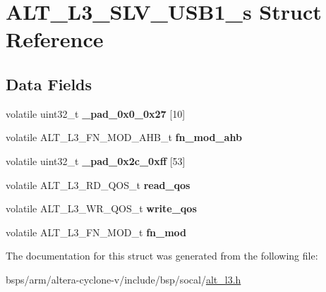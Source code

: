 \hypertarget{structALT__L3__SLV__USB1__s}{}\section{A\+L\+T\+\_\+\+L3\+\_\+\+S\+L\+V\+\_\+\+U\+S\+B1\+\_\+s Struct Reference}
\label{structALT__L3__SLV__USB1__s}
\subsection*{Data Fields}
\begin{DoxyCompactItemize}
\item 
\mbox{\label{structALT__L3__SLV__USB1__s_a1f61c8e412c516aedd16a1d323ba41f9}} 
volatile uint32\+\_\+t {\bfseries \+\_\+pad\+\_\+0x0\+\_\+0x27} \mbox{[}10\mbox{]}
\item 
\mbox{\label{structALT__L3__SLV__USB1__s_a2f48c422cec854a01c93eeb5cd0ba6a3}} 
volatile A\+L\+T\+\_\+\+L3\+\_\+\+F\+N\+\_\+\+M\+O\+D\+\_\+\+A\+H\+B\+\_\+t {\bfseries fn\+\_\+mod\+\_\+ahb}
\item 
\mbox{\label{structALT__L3__SLV__USB1__s_ad3040ca7775cb2c3b9991951a328ca86}} 
volatile uint32\+\_\+t {\bfseries \+\_\+pad\+\_\+0x2c\+\_\+0xff} \mbox{[}53\mbox{]}
\item 
\mbox{\label{structALT__L3__SLV__USB1__s_a4200b964aaa44a5a44abe23cdfe0c15b}} 
volatile A\+L\+T\+\_\+\+L3\+\_\+\+R\+D\+\_\+\+Q\+O\+S\+\_\+t {\bfseries read\+\_\+qos}
\item 
\mbox{\label{structALT__L3__SLV__USB1__s_a114802d959d5abc682c20f9b3fd2246d}} 
volatile A\+L\+T\+\_\+\+L3\+\_\+\+W\+R\+\_\+\+Q\+O\+S\+\_\+t {\bfseries write\+\_\+qos}
\item 
\mbox{\label{structALT__L3__SLV__USB1__s_a556d2dfa8b857e7db5eab6ec36da5e9e}} 
volatile A\+L\+T\+\_\+\+L3\+\_\+\+F\+N\+\_\+\+M\+O\+D\+\_\+t {\bfseries fn\+\_\+mod}
\end{DoxyCompactItemize}


The documentation for this struct was generated from the following file\+:\begin{DoxyCompactItemize}
\item 
bsps/arm/altera-\/cyclone-\/v/include/bsp/socal/\mbox{\hyperlink{alt__l3_8h}{alt\+\_\+l3.\+h}}\end{DoxyCompactItemize}
